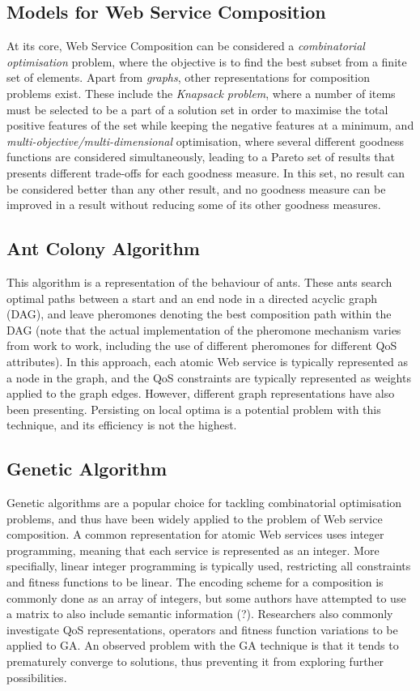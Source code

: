 \subsection{Models for Web Service Composition}
At its core, Web Service Composition can be considered a \textit{combinatorial optimisation} problem, where
the objective is to find the best subset from a finite set of elements. Apart from \textit{graphs}, other representations 
for composition problems exist. These include the \textit{Knapsack problem}, where a number of items must be
selected to be a part of a solution set in order to maximise the total positive features of the set while keeping
the negative features at a minimum, and \textit{multi-objective/multi-dimensional} optimisation, where several
different goodness functions are considered simultaneously, leading to a Pareto set of results that presents different
trade-offs for each goodness measure. In this set, no result can be considered better than any other result, and no goodness
measure can be improved in a result without reducing some of its other goodness measures.

\subsection{Ant Colony Algorithm}
This algorithm is a representation of the behaviour of ants. These ants search optimal paths between a start and
an end node in a directed acyclic graph (DAG), and leave pheromones denoting the best composition path within the
DAG (note that the actual implementation of the pheromone mechanism varies from work to work, including the use of
different pheromones for different QoS attributes). In this approach, each atomic Web service is typically represented
as a node in the graph, and the QoS constraints are typically represented as weights applied to the graph edges.
However, different graph representations have also been presenting. Persisting on local optima is a potential problem
with this technique, and its efficiency is not the highest.

\subsection{Genetic Algorithm}
Genetic algorithms are a popular choice for tackling combinatorial optimisation problems, and thus have been widely
applied to the problem of Web service composition. A common representation for atomic Web services uses integer programming,
meaning that each service is represented as an integer. More specifially, linear integer programming is typically used,
restricting all constraints and fitness functions to be linear. The encoding scheme for a composition is commonly done 
as an array of integers, but some authors have attempted to use a matrix to also include semantic information (?). Researchers
also commonly investigate QoS representations, operators and fitness function variations to be applied to GA. An observed
problem with the GA technique is that it tends to prematurely converge to solutions, thus preventing it from exploring further
possibilities.

